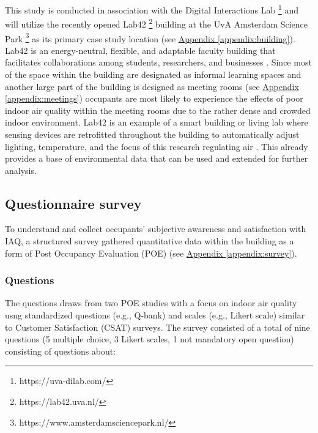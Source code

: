 This study is conducted in association with the Digital Interactions Lab \footnote{https://uva-dilab.com/} and will utilize the recently opened Lab42 \footnote{https://lab42.uva.nl/} building at the UvA Amsterdam Science Park \footnote{https://www.amsterdamsciencepark.nl/} as its primary case study location (see \hyperref[appendix:building]{Appendix \ref*{appendix:building}}). Lab42 is an energy-neutral, flexible, and adaptable faculty building that facilitates collaborations among students, researchers, and businesses \cite{benthem_2022}. Since most of the space within the building are designated as informal learning spaces and another large part of the building is designed as meeting rooms (see \hyperref[appendix:meetings]{Appendix \ref*{appendix:meetings}}) occupants are most likely to experience the effects of poor indoor air quality within the meeting rooms due to the rather dense and crowded indoor environment. Lab42 is an example of a smart building or living lab where sensing devices are retrofitted throughout the building to automatically adjust lighting, temperature, and the focus of this research regulating air \cite{architects_lab42_2022}. This already provides a base of environmental data that can be used and extended for further analysis. 


\subsection{Questionnaire survey}
\label{sec:questionnaire}

To understand and collect occupants' subjective awareness and satisfaction with IAQ, a structured survey gathered quantitative data within the building as a form of Post Occupancy Evaluation (POE) (see \hyperref[appendix:survey]{Appendix \ref*{appendix:survey}}).


\subsubsection{Questions}
The questions draws from two POE studies with a focus on indoor air quality \cite{silva_post-occupancy_2017, son_perceived_2023} usng standardized questions (e.g., Q-bank) and scales (e.g., Likert scale) similar to Customer Satisfaction (CSAT) surveys. The survey consisted of a total of nine questions (5 multiple choice, 3 Likert scales, 1 not mandatory open question) consisting of questions about:

